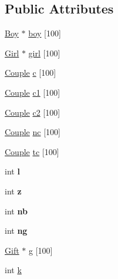 \subsection*{Public Attributes}
\begin{DoxyCompactItemize}
\item 
\hyperlink{classBoy}{Boy} $\ast$ \hyperlink{classInitialize_a46ae196a0b36e6af8da27704e06d164e}{boy} \mbox{[}100\mbox{]}
\item 
\hyperlink{classGirl}{Girl} $\ast$ \hyperlink{classInitialize_a6a334c44226cfbc12743accd0881da87}{girl} \mbox{[}100\mbox{]}
\item 
\hyperlink{classCouple}{Couple} \hyperlink{classInitialize_aaf5cb4df24e3003d80466a8f1efe2304}{c} \mbox{[}100\mbox{]}
\item 
\hyperlink{classCouple}{Couple} \hyperlink{classInitialize_ad2879f7f66c574bbccf3b61cb3aac1de}{c1} \mbox{[}100\mbox{]}
\item 
\hyperlink{classCouple}{Couple} \hyperlink{classInitialize_addf59fd3ee5e6044a0f294e37f8956b3}{c2} \mbox{[}100\mbox{]}
\item 
\hyperlink{classCouple}{Couple} \hyperlink{classInitialize_aec3f194771e24ddfa062353ec0990039}{nc} \mbox{[}100\mbox{]}
\item 
\hyperlink{classCouple}{Couple} \hyperlink{classInitialize_a04d71451f0caaf3d6dc5684d18ee7c62}{tc} \mbox{[}100\mbox{]}
\item 
int {\bfseries l}\hypertarget{classInitialize_af5943d11afb51e3da83dfcc23ec34194}{}\label{classInitialize_af5943d11afb51e3da83dfcc23ec34194}

\item 
int {\bfseries z}\hypertarget{classInitialize_a2cadf887bc3ad757d6273e7745bf6b6a}{}\label{classInitialize_a2cadf887bc3ad757d6273e7745bf6b6a}

\item 
int {\bfseries nb}\hypertarget{classInitialize_a60d0fc70c752d6ba17b77eea5d72a6be}{}\label{classInitialize_a60d0fc70c752d6ba17b77eea5d72a6be}

\item 
int {\bfseries ng}\hypertarget{classInitialize_ab2204d9d919987aeaf0fe30ce1afbfd8}{}\label{classInitialize_ab2204d9d919987aeaf0fe30ce1afbfd8}

\item 
\hyperlink{classGift}{Gift} $\ast$ \hyperlink{classInitialize_afe44835fd27dbb25627811bd8b907f66}{g} \mbox{[}100\mbox{]}
\item 
int \hyperlink{classInitialize_ac259c3b0b9d9f84312db8c235f3296f0}{k}
\end{DoxyCompactItemize}


